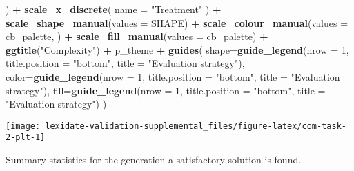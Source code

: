 \documentclass[
]{book}
\newenvironment{Shaded}{\begin{snugshade}}{\end{snugshade}}
\newcommand{\AttributeTok}[1]{\textcolor[rgb]{0.13,0.29,0.53}{#1}}
\newcommand{\DecValTok}[1]{\textcolor[rgb]{0.00,0.00,0.81}{#1}}
\newcommand{\FunctionTok}[1]{\textcolor[rgb]{0.13,0.29,0.53}{\textbf{#1}}}
\newcommand{\NormalTok}[1]{#1}
\newcommand{\SpecialCharTok}[1]{\textcolor[rgb]{0.81,0.36,0.00}{\textbf{#1}}}
\newcommand{\StringTok}[1]{\textcolor[rgb]{0.31,0.60,0.02}{#1}}
\begin{document}
\begin{Shaded}
\begin{Highlighting}[]
\NormalTok{  ) }\SpecialCharTok{+}
  \FunctionTok{scale\_x\_discrete}\NormalTok{(}
    \AttributeTok{name =} \StringTok{"Treatment"}
\NormalTok{  ) }\SpecialCharTok{+}
  \FunctionTok{scale\_shape\_manual}\NormalTok{(}\AttributeTok{values =}\NormalTok{ SHAPE) }\SpecialCharTok{+}
  \FunctionTok{scale\_colour\_manual}\NormalTok{(}\AttributeTok{values =}\NormalTok{ cb\_palette, ) }\SpecialCharTok{+}
  \FunctionTok{scale\_fill\_manual}\NormalTok{(}\AttributeTok{values =}\NormalTok{ cb\_palette) }\SpecialCharTok{+}
  \FunctionTok{ggtitle}\NormalTok{(}\StringTok{"Complexity"}\NormalTok{) }\SpecialCharTok{+}
\NormalTok{  p\_theme }\SpecialCharTok{+}
  \FunctionTok{guides}\NormalTok{(}
    \AttributeTok{shape=}\FunctionTok{guide\_legend}\NormalTok{(}\AttributeTok{nrow =} \DecValTok{1}\NormalTok{, }\AttributeTok{title.position =} \StringTok{"bottom"}\NormalTok{,}
                       \AttributeTok{title =} \StringTok{"Evaluation strategy"}\NormalTok{),}
    \AttributeTok{color=}\FunctionTok{guide\_legend}\NormalTok{(}\AttributeTok{nrow =} \DecValTok{1}\NormalTok{, }\AttributeTok{title.position =} \StringTok{"bottom"}\NormalTok{,}
                       \AttributeTok{title =} \StringTok{"Evaluation strategy"}\NormalTok{),}
    \AttributeTok{fill=}\FunctionTok{guide\_legend}\NormalTok{(}\AttributeTok{nrow =} \DecValTok{1}\NormalTok{, }\AttributeTok{title.position =} \StringTok{"bottom"}\NormalTok{,}
                      \AttributeTok{title =} \StringTok{"Evaluation strategy"}\NormalTok{)}
\NormalTok{  )}
\end{Highlighting}
\end{Shaded}

\texttt{[image: lexidate-validation-supplemental\_files/figure-latex/com-task-2-plt-1]}

Summary statistics for the generation a satisfactory solution is found.
\end{document}
